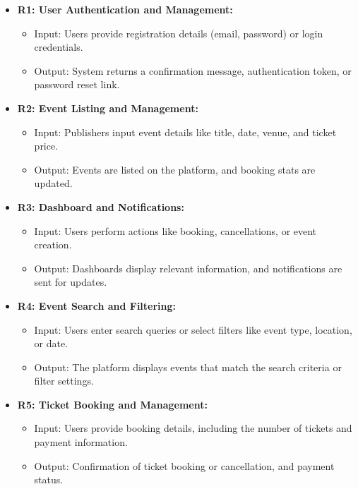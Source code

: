 \documentclass[twoside,a4paper,openright]{report} %
\begin{document}
\begin{itemize}
	\item \textbf{R1: User Authentication and Management:}
	\begin{itemize}
		\item Input: Users provide registration details (email, password) or login credentials.
		\item Output: System returns a confirmation message, authentication token, or password reset link.
	\end{itemize}
	
	\item \textbf{R2: Event Listing and Management:}
	\begin{itemize}
		\item Input: Publishers input event details like title, date, venue, and ticket price.
		\item Output: Events are listed on the platform, and booking stats are updated.
	\end{itemize}
	
	\item \textbf{R3: Dashboard and Notifications:}
	\begin{itemize}
		\item Input: Users perform actions like booking, cancellations, or event creation.
		\item Output: Dashboards display relevant information, and notifications are sent for updates.
	\end{itemize}
	
	\item \textbf{R4: Event Search and Filtering:}
	\begin{itemize}
		\item Input: Users enter search queries or select filters like event type, location, or date.
		\item Output: The platform displays events that match the search criteria or filter settings.
	\end{itemize}
	
	\item \textbf{R5: Ticket Booking and Management:}
	\begin{itemize}
		\item Input: Users provide booking details, including the number of tickets and payment information.
		\item Output: Confirmation of ticket booking or cancellation, and payment status.
	\end{itemize}
	

\end{itemize}
\end{document}
